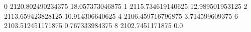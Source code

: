 0 2120.802490234375 18.057373046875
1 2115.734619140625 12.989501953125
2 2113.659423828125 10.914306640625
4 2106.459716796875 3.714599609375
6 2103.512451171875 0.767333984375
8 2102.7451171875 0.0

